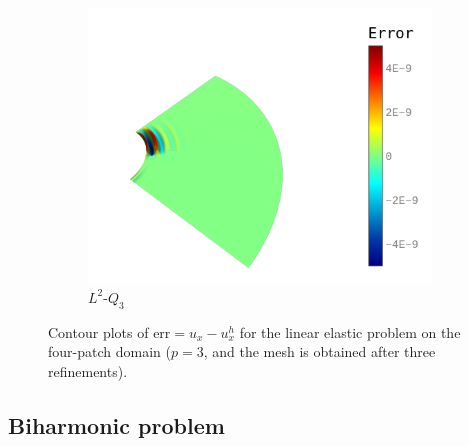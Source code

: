 \begin{figure}[ht]
\begin{subfigure}[t]{.45\linewidth}
		\center
		\includegraphics[scale=.4]{l2_annular}
		\caption{$L^2$-$Q_3$}
	\end{subfigure}
	\caption{Contour plots of $\text{err} = u_x-u^h_x$ for the linear elastic problem on the four-patch domain ($p=3$, and the mesh is obtained after three refinements). }\label{fig:contour_plate_with_hole}
\end{figure}
\FloatBarrier

\subsection{Biharmonic problem}\label{sec:biharmonic_problem}

